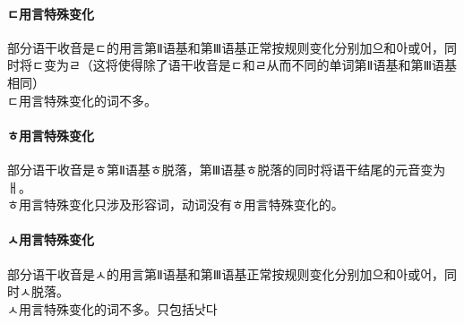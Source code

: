 \paragraph{ㄷ用言特殊变化}
部分语干收音是ㄷ的用言第Ⅱ语基和第Ⅲ语基正常按规则变化分别加으和아或어，同时将ㄷ变为ㄹ（这将使得除了语干收音是ㄷ和ㄹ从而不同的单词第Ⅱ语基和第Ⅲ语基相同）
\\ㄷ用言特殊变化的词不多。
\paragraph{ㅎ用言特殊变化}
部分语干收音是ㅎ第Ⅱ语基ㅎ脱落，第Ⅲ语基ㅎ脱落的同时将语干结尾的元音变为ㅐ。
\\ㅎ用言特殊变化只涉及形容词，动词没有ㅎ用言特殊变化的。
\paragraph{ㅅ用言特殊变化}
部分语干收音是ㅅ的用言第Ⅱ语基和第Ⅲ语基正常按规则变化分别加으和아或어，同时ㅅ脱落。
\\ㅅ用言特殊变化的词不多。只包括낫다